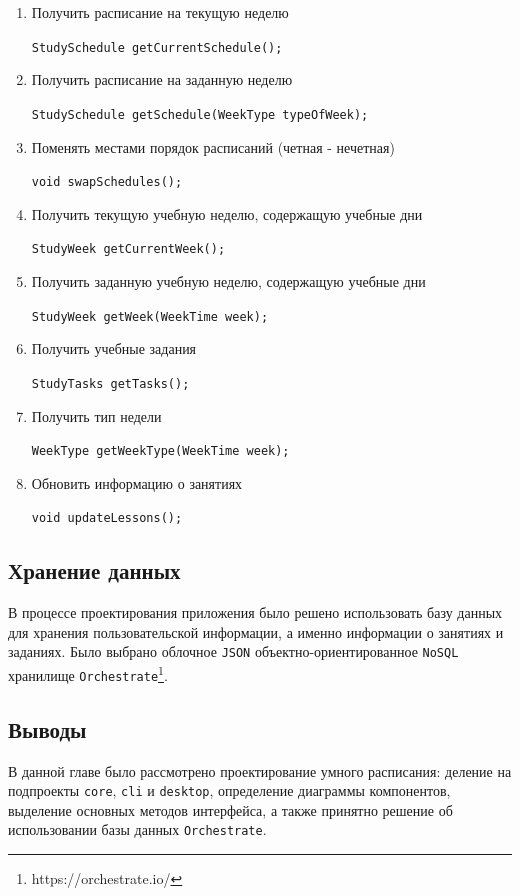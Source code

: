 \begin{enumerate}

    \item Получить расписание на текущую неделю

    \verb+StudySchedule getCurrentSchedule();+


    \item Получить расписание на заданную неделю

    \verb+StudySchedule getSchedule(WeekType typeOfWeek);+


    \item Поменять местами порядок расписаний (четная - нечетная)

    \verb+void swapSchedules();+


    \item Получить текущую учебную неделю, содержащую учебные дни

    \verb+StudyWeek getCurrentWeek();+


    \item Получить заданную учебную неделю, содержащую учебные дни

    \verb+StudyWeek getWeek(WeekTime week);+


    \item Получить учебные задания

    \verb+StudyTasks getTasks();+


    \item Получить тип недели

    \verb+WeekType getWeekType(WeekTime week);+

    
    \item Обновить информацию о занятиях

    \verb+void updateLessons();+
    
\end{enumerate}

\subsection{Хранение данных}
В процессе проектирования приложения было решено использовать базу данных для хранения пользовательской информации, а именно информации о занятиях и заданиях. Было выбрано  облочное \texttt{JSON} объектно-ориентированное \texttt{NoSQL} хранилище \texttt{Orchestrate}\footnote{https://orchestrate.io/}. 

\subsection{Выводы}
В данной главе было рассмотрено проектирование умного расписания: деление на подпроекты \texttt{core}, \texttt{cli} и \texttt{desktop}, определение диаграммы компонентов, выделение основных методов интерфейса, а также принятно решение об использовании базы данных \texttt{Orchestrate}.

